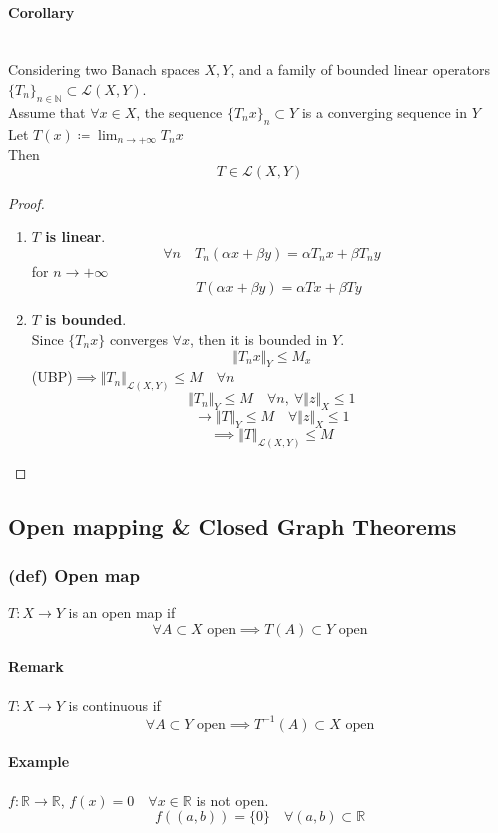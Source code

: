 \paragraph{Corollary} \ \\
Considering two Banach spaces $X,Y$, and a family of bounded linear operators $\{ T_n\}_{n\in \mathbb N} \subset \mathcal L(X,Y)$.\\
Assume that $\forall x\in X$, the sequence $ \{ T_nx\}_n\subset Y$ is a converging sequence in $Y$\\
Let $T(x)\coloneqq \lim_{n\to+\infty}T_nx$\\
Then $$T\in \mathcal L(X,Y)$$
\begin{proof}\ 
    \begin{enumerate}
        \item  \textbf{$T$ is linear}.$$\forall n\quad T_n(\alpha x+\beta y)=\alpha T_nx+\beta T_ny$$
    for $n\to+\infty$
        $$\quad T(\alpha x+\beta y)=\alpha Tx+\beta Ty$$
\item \textbf{$T$ is bounded}. \\Since $\{ T_nx\}$ converges $\forall x$, then it is bounded in $Y$.
$$\Vert T_nx\Vert_Y\leq M_x$$
(UBP)$\implies \Vert T_n\Vert_{\mathcal L(X,Y)}\leq M\quad \forall n$
$$\Vert T_n\Vert_Y\leq M\quad \forall n,\ \forall \Vert z\Vert_X\leq 1$$
$$\to\Vert T\Vert_Y\leq M\quad\forall \Vert z\Vert_X\leq 1$$
$$\implies \Vert T\Vert_{\mathcal L(X,Y)}\leq M$$
    \end{enumerate}
    
\end{proof}
\subsection{Open mapping \& Closed Graph Theorems}
\subsubsection{(def) Open map}
$T:X\to Y$ is an open map if $$\forall A\subset X\text{ open}\implies T(A)\subset Y\text{ open}$$
\paragraph{Remark}
$T:X\to Y$ is continuous if $$\forall A\subset Y\text{ open}\implies T^{-1}(A)\subset X\text{ open}$$
\paragraph{Example}
$f:\mathbb R\to\mathbb R$, $f(x)=0\quad \forall x\in \mathbb R$ is not open.
$$f((a,b))=\{0\}\quad \forall (a,b)\subset \mathbb R$$
